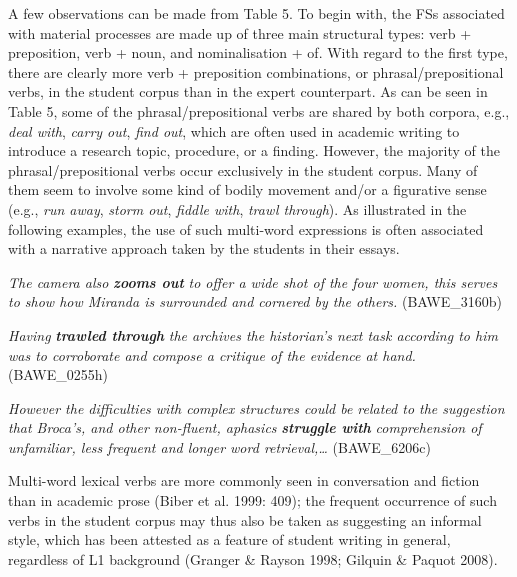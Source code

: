 \begin{styleStandard}
A few observations can be made from Table 5. To begin with, the FSs associated with material processes are made up of three main structural types: verb + preposition, verb + noun, and nominalisation + of. With regard to the first type, there are clearly more verb + preposition combinations, or phrasal/prepositional verbs, in the student corpus than in the expert counterpart. As can be seen in Table 5, some of the phrasal/prepositional verbs are shared by both corpora, e.g., \textit{deal with}, \textit{carry out}, \textit{find out}, which are often used in academic writing to introduce a research topic, procedure, or a finding. However, the majority of the phrasal/prepositional verbs occur exclusively in the student corpus. Many of them seem to involve some kind of bodily movement and/or a figurative sense (e.g., \textit{run away}, \textit{storm out}, \textit{fiddle with}, \textit{trawl through}). As illustrated in the following examples, the use of such multi-word expressions is often associated with a narrative approach taken by the students in their essays. 
\end{styleStandard}


\setcounter{listWWNumxxixleveli}{0}
\begin{listWWNumxxixleveli}
\item 
\begin{styleListParagraph}
\textit{The camera also }\textbf{\textit{zooms out}}\textit{ to offer a wide shot of the four women, this serves to show how Miranda is surrounded and cornered by the others.} (BAWE\_3160b)
\end{styleListParagraph}
\item 
\begin{styleListParagraph}
\textit{Having }\textbf{\textit{trawled through}}\textit{ the archives the historian’s next task according to him was to corroborate and compose a critique of the evidence at hand.} (BAWE\_0255h)
\end{styleListParagraph}
\item 
\begin{styleListParagraph}
\textit{However the difficulties with complex structures could be related to the suggestion that Broca’s, and other non-fluent, aphasics }\textbf{\textit{struggle with}}\textit{ comprehension of unfamiliar, less frequent and longer word retrieval,…} (BAWE\_6206c)
\end{styleListParagraph}
\end{listWWNumxxixleveli}
\begin{styleStandard}
Multi-word lexical verbs are more commonly seen in conversation and fiction than in academic prose (Biber et al. 1999: 409); the frequent occurrence of such verbs in the student corpus may thus also be taken as suggesting an informal style, which has been attested as a feature of student writing in general, regardless of L1 background (Granger \& Rayson 1998; Gilquin \& Paquot 2008). 
\end{styleStandard}

